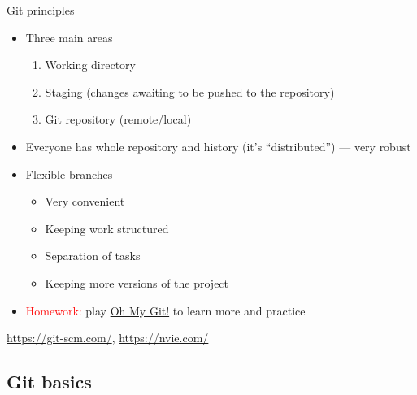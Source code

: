\documentclass[compress, xelatex, 11pt, xcolor=svgnames, aspectratio=169,
	hyperref={
		bookmarks=true,
		unicode=true,
		colorlinks=true,
		pdftitle={Linux, command line and MetaCentrum},
		plainpages=false,
		pdfauthor={Vojtech Zeisek},
		pdfsubject={Course about use of Linux command line, writing shell scripts and using MetaCentrum of CESNET},
		pdfcreator={XeLaTeX},
		pdfkeywords={Linux, GNU, BASH, shell, command line, MetaCentrum},
		linkcolor=DarkRed, %
		anchorcolor=DarkBlue, %
		citecolor=Indigo, %
		filecolor=NavyBlue, %
		menucolor=DarkMagenta, %
		urlcolor=DarkBlue, %
		},
	url={hyphens, lowtilde} %
	]{beamer}
\renewcommand{\texttt}[1]{\colorbox{Beige}{{\ttfamily #1}}}
\renewcommand{\alert}[1]{\textcolor{red}{#1}}
\begin{document}
\begin{frame}[fragile]{Git principles}
	\begin{multicols}{2}
		\begin{itemize}
			\item Three main areas
			\begin{enumerate}
				\item Working directory
				\item Staging (changes awaiting to be pushed to the repository)
				\item Git repository (remote/local)
			\end{enumerate}
			\item Everyone has whole repository and history (it's \enquote{distributed}) --- very robust
			\item Flexible branches
			\begin{itemize}
				\item Very convenient
				\item Keeping work structured
				\item Separation of tasks
				\item Keeping more versions of the project
			\end{itemize}
			\item \alert{Homework:} play \href{https://ohmygit.org/}{Oh My Git!} to learn more and practice
		\end{itemize}
		\begin{center}
			\texttt{[image: git.png]}
		\end{center}
		\begin{flushright}
			\begin{footnotesize}
				\href{https://git-scm.com/book/en/v2/Getting-Started-What-is-Git\%3F}{https://git-scm.com/}, \href{https://nvie.com/posts/a-successful-git-branching-model/}{https://nvie.com/}
			\end{footnotesize}
		\end{flushright}
	\end{multicols}
\end{frame}

\subsection{Git basics}
\end{document}
